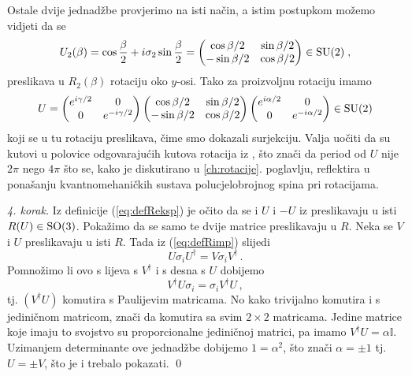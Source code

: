 Ostale dvije jednadžbe provjerimo na isti način, a istim postupkom možemo
vidjeti da se
\begin{equation}
    U_{2}(\beta) =   \cos\frac{\beta}{2} + i \sigma_{2} \sin\frac{\beta}{2} =
    \begin{pmatrix}
        \cos{\beta}/{2} & \sin{\beta}/{2} \\
        -\sin{\beta}/{2} & \cos{\beta}/{2}
    \end{pmatrix} \in \mathrm{SU}(2) \;,
\end{equation}
preslikava u
$R_{2}(\beta)$ rotaciju oko $y$-osi. Tako za proizvoljnu rotaciju imamo
\begin{equation}
U = 
    \begin{pmatrix}
        e^{i\gamma/2} & 0 \\
        0 & e^{-i\gamma/2}
    \end{pmatrix} 
    \begin{pmatrix}
        \cos{\beta}/{2} & \sin{\beta}/{2} \\
        -\sin{\beta}/{2} & \cos{\beta}/{2}
    \end{pmatrix}
    \begin{pmatrix}
        e^{i\alpha/2} & 0 \\
        0 & e^{-i\alpha/2}
    \end{pmatrix}  \in \mathrm{SU}(2)
\end{equation}
koji se u tu rotaciju preslikava, čime smo dokazali surjekciju.
Valja uočiti da su kutovi u  polovice odgovarajućih kutova rotacija iz ,
što znači da period od $U$ nije $2\pi$ nego $4\pi$ što se, kako je diskutirano u
\ref{ch:rotacije}. poglavlju,
reflektira u ponašanju kvantnomehaničkih sustava polucjelobrojnog spina pri rotacijama.

\emph{4. korak.}
Iz definicije (\ref{eq:defReksp}) je očito da se i $U$ i $-U$ iz  preslikavaju
u isti $R(U) \in \mathrm{SO}(3)$. Pokažimo da se samo te dvije matrice preslikavaju u $R$.
Neka se $V$ i $U$ preslikavaju u isti $R$. Tada iz (\ref{eq:defRimp}) slijedi
\begin{equation}
    U \sigma_i U^\dagger = V \sigma_i V^\dagger \,.
\end{equation}
Pomnožimo li ovo  s lijeva s $V^\dagger$ i s desna s $U$ dobijemo
\begin{equation}
    V^\dagger U \sigma_i = \sigma_i V^\dagger U \,,
\end{equation}
tj. $(V^\dagger U)$ komutira s Paulijevim matricama. No kako trivijalno
komutira i s jediničnom matricom, znači da komutira sa svim $2 \times 2$
matricama. Jedine matrice koje imaju to svojstvo su proporcionalne jediničnoj
matrici, pa imamo $V^\dagger U = \alpha \mathbb{I}$. Uzimanjem determinante
ove jednadžbe dobijemo $1 = \alpha^2$, što znači $\alpha=\pm 1$ tj.
$U = \pm V$, što je i trebalo pokazati. \qed

